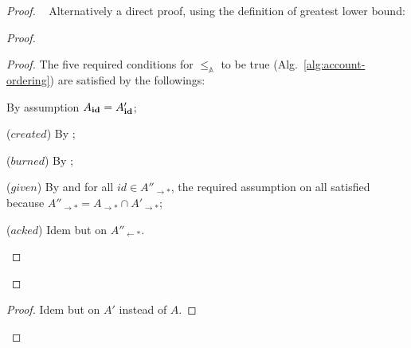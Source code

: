 \documentclass[9pt]{article}   	%
\begin{document}
\begin{proof}
	
\pf~	
Alternatively a direct proof, using the definition of greatest lower bound:
	\begin{proof}
				
		
		
		\qedstep
		\begin{proof}
			The five required conditions for $\leq_\mathds{A}$ to be true (Alg.~\ref{alg:account-ordering}) are satisfied by the followings:
			\begin{pfenum}
				\item By assumption $A_{\scriptsize \textbf{id}} = A'_{\scriptsize \textbf{id}}$;
				\item ($\textit{created}$) By ;
				\item ($\textit{burned}$) By ;
				\item ($\textit{given}$) By  and  for all $id \in A''_{\rightarrow *}$, the required assumption on  all satisfied because $A''_{\rightarrow *} = A_{\rightarrow *} \cap A'_{\rightarrow *}$;
				\item ($\textit{acked}$) Idem but on $A''_{\leftarrow *}$.
			\end{pfenum}
		\end{proof}
	\end{proof}
	
	\begin{proof}
		Idem  but on $A'$ instead of $A$.
	\end{proof}
	

\end{proof}
\end{document}
